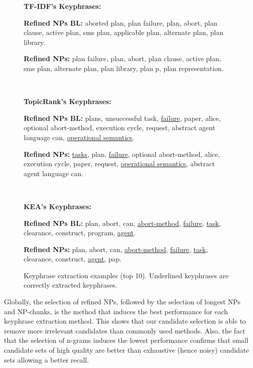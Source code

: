 \begin{figure*}[t]
{{            \textbf{TF-IDF's Keyphrases:}

            \setlength\parindent{12pt}
            \textbf{Refined NPs BL:} aborted plan, plan failure, plan, abort,
            plan clause, active plan, sms plan, applicable plan, alternate plan,
            plan library.

            \textbf{Refined NPs:} plan failure, plan, abort, plan clause, active
            plan, sms plan, alternate plan, plan library, plan p, plan
            representation.

            \setlength\parindent{0pt}\dotfill\\\vspace{-0.7em}

            \textbf{TopicRank's Keyphrases:}

            \setlength\parindent{12pt}
            \textbf{Refined NPs BL:} plans, unsuccessful task,
            \underline{failure}, paper, alice, optional abort-method, execution
            cycle, request, abstract agent language can, \underline{operational
            semantics}.

            \textbf{Refined NPs:} \underline{tasks}, plan, \underline{failure},
            optional abort-method, alice, execution cycle, paper, request,
            \underline{operational semantics}, abstract agent language can.

            \setlength\parindent{0pt}\dotfill\\\vspace{-0.7em}

            \textbf{KEA's Keyphrases:}

            \setlength\parindent{12pt}
            \textbf{Refined NPs BL:} plan, abort, can, \underline{abort-method},
            \underline{failure}, \underline{task}, clearance, construct,
            program, \underline{agent}.

            \textbf{Refined NPs:} plan, abort, can, \underline{abort-method},
            \underline{failure}, \underline{task}, clearance, construct,
            \underline{agent}, pap.
            \setlength\parindent{0pt}
          }
        }
        \caption{Keyphrase extraction examples (top 10). Underlined keyphrases
                 are correctly extracted keyphrases.
                 \label{fig:example}}
      \end{figure*}
      
      Globally, the selection of refined NPs, followed by the selection of
      longest NPs and NP-chunks, is the method that induces the best performance
      for each keyphrase extraction method. This shows that our candidate
      selection is able to remove more irrelevant candidates than commonly used
      methods. Also, the fact that the selection of n-grams induces the lowest
      performance confirms that small candidate sets of high quality are better
      than exhaustive (hence noisy) candidate sets allowing a better recall.
      
